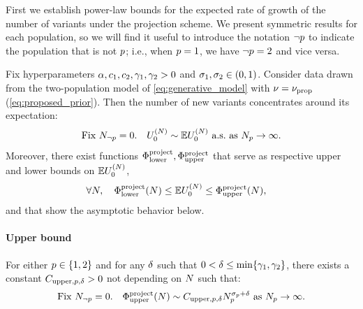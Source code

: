 First we establish power-law bounds for the expected rate of growth of the number of variants under the projection scheme. We present symmetric results for each population, so we will find it useful to introduce the notation $\neg p$ to indicate the population that is not $p$; i.e., when $p = 1$, we have $\neg p = 2$ and vice versa.
\begin{myProposition} 
\label{prop:power_law_proj}
	Fix hyperparameters $\alpha, c_{1}, c_{2}, \gamma_{1}, \gamma_{2}>0$ and $\sigma_{1}, \sigma_{2} \in (0,1)$.
	Consider data drawn from the two-population model of \cref{eq:generative_model} with $\nu = \nu_{\mathrm{prop}}$ (\cref{eq:proposed_prior}).
	Then the number of new variants concentrates around its expectation: 
	\[
		\textrm{Fix } \samplesize{\notpopidx} = 0. \quad \news{\zerovec}{\vecsamplesize} \sim \E \news{\zerovec}{\vecsamplesize}\textrm{ a.s.\ as } \samplesize{\popidx} \to \infty.
	\]
	Moreover, there exist functions $\Phi_{\mathrm{lower}}^{\mathrm{project}}, \Phi_{\mathrm{upper}}^{\mathrm{project}}$ that serve as respective upper and lower bounds on $\E \news{\zerovec}{\vecsamplesize}$,
	\begin{equation} 
		\label{eq:projection_bounds}
		\begin{aligned}
			&\forall \vecsamplesize, \quad \lowerboundproject(\vecsamplesize)
			\le \E \news{\zerovec}{\vecsamplesize}
			\le \upperboundproject (\vecsamplesize),
		\end{aligned}
	\end{equation}
	and that show the asymptotic behavior below.
	\paragraph{Upper bound} For either $p \in \{1,2\}$ and for any $\delta$ such that $0<\delta\le \min\{\gamma_{1},\gamma_{2}\}$, there exists a constant $C_{\mathrm{upper},p,\delta} > 0$ not depending on $\vecsamplesize$ such that:
	\begin{equation}
		\label{eq:power-law_projection-upperbound}
		\textrm{Fix } \samplesize{\notpopidx} = 0. \quad  \upperboundproject (\vecsamplesize)
			\sim \constantupper{\popidx} \samplesize{\popidx}^{\rate{\popidx}+\smallpositive} \textrm{ as } \samplesize{\popidx} \to \infty.
	\end{equation}

\end{myProposition}
